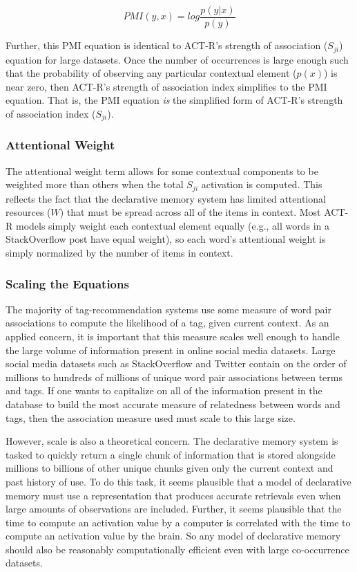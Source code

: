\documentclass[man,floatsintext,donotrepeattitle]{apa6}
\begin{document}
\begin{equation}
  \label{eqPMI}
  \mathit{PMI}(y,x) = log \frac{p(y|x)}{p(y)}
\end{equation}

Further, this PMI equation is identical to ACT-R's strength of association ($S_{ji}$) equation for large datasets.
Once the number of occurrences is large enough such that the probability of observing any particular contextual element ($p(x)$) is near zero, then ACT-R's strength of association index simplifies to the PMI equation.
That is, the PMI equation \emph{is} the simplified form of ACT-R's strength of association index ($S_{ji}$).

\subsubsection{Attentional Weight}

The attentional weight term allows for some contextual components to be weighted more than others when the total $S_{ji}$ activation is computed.
This reflects the fact that the declarative memory system has limited attentional resources ($W$) that must be spread across all of the items in context.
Most ACT-R models simply weight each contextual element equally (e.g., all words in a StackOverflow post have equal weight), so each word's attentional weight is simply normalized by the number of items in context.

\subsubsection{Scaling the Equations}

The majority of tag-recommendation systems use some measure of word pair associations to compute the likelihood of a tag, given current context.
As an applied concern, it is important that this measure scales well enough to handle the large volume of information present in online social media datasets.
Large social media datasets such as StackOverflow and Twitter contain on the order of millions to hundreds of millions of unique word pair associations between terms and tags.
If one wants to capitalize on all of the information present in the database to build the most accurate measure of relatedness between words and tags, then the association measure used must scale to this large size.

However, scale is also a theoretical concern.
The declarative memory system is tasked to quickly return a single chunk of information that is stored alongside millions to billions of other unique chunks given only the current context and past history of use.
To do this task, it seems plausible that a model of declarative memory must use a representation that produces accurate retrievals even when large amounts of observations are included.
Further, it seems plausible that the time to compute an activation value by a computer is correlated with the time to compute an activation value by the brain.
So any model of declarative memory should also be reasonably computationally efficient even with large co-occurrence datasets.
\end{document}
